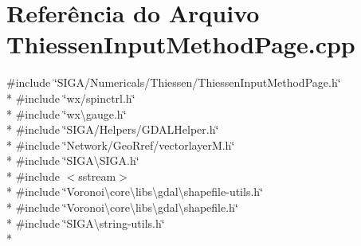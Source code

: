 \section{Referência do Arquivo Thiessen\+Input\+Method\+Page.\+cpp}
\label{_thiessen_input_method_page_8cpp}
{\ttfamily \#include \char`\"{}S\+I\+G\+A/\+Numericals/\+Thiessen/\+Thiessen\+Input\+Method\+Page.\+h\char`\"{}}\\*
{\ttfamily \#include \char`\"{}wx/spinctrl.\+h\char`\"{}}\\*
{\ttfamily \#include \char`\"{}wx\textbackslash{}gauge.\+h\char`\"{}}\\*
{\ttfamily \#include \char`\"{}S\+I\+G\+A/\+Helpers/\+G\+D\+A\+L\+Helper.\+h\char`\"{}}\\*
{\ttfamily \#include \char`\"{}Network/\+Geo\+Rref/vectorlayer\+M.\+h\char`\"{}}\\*
{\ttfamily \#include \char`\"{}S\+I\+G\+A\textbackslash{}\+S\+I\+G\+A.\+h\char`\"{}}\\*
{\ttfamily \#include $<$sstream$>$}\\*
{\ttfamily \#include \char`\"{}Voronoi\textbackslash{}core\textbackslash{}libs\textbackslash{}gdal\textbackslash{}shapefile-\/utils.\+h\char`\"{}}\\*
{\ttfamily \#include \char`\"{}Voronoi\textbackslash{}core\textbackslash{}libs\textbackslash{}gdal\textbackslash{}shapefile.\+h\char`\"{}}\\*
{\ttfamily \#include \char`\"{}S\+I\+G\+A\textbackslash{}string-\/utils.\+h\char`\"{}}\\*
